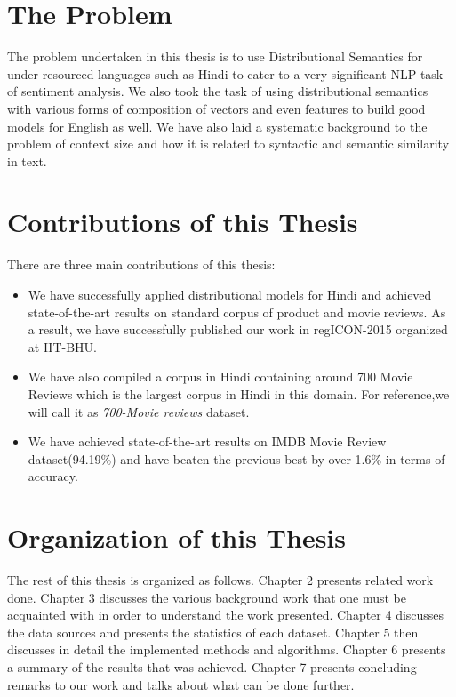 \section{The Problem}
The problem undertaken in this thesis is to use Distributional Semantics for under-resourced languages such as Hindi to cater to a very significant NLP task of sentiment analysis. We also took the task of using distributional semantics with various forms of composition of vectors and even features to build good models for English as well. We have also laid a systematic background to the problem of context size and how it is related to syntactic and semantic similarity in text. 

\section{Contributions of this Thesis}
There are three main contributions of this thesis:
\begin{itemize}
\item We have successfully applied distributional models for Hindi and achieved state-of-the-art results on standard corpus of product and movie reviews. As a result, we have successfully published our work in regICON-2015 organized at IIT-BHU.
\item We have also compiled a corpus in Hindi containing around 700 Movie Reviews which is the largest corpus in Hindi in this domain. For reference,we will call it as \emph{700-Movie reviews} dataset.
\item We have achieved state-of-the-art results on IMDB Movie Review dataset(94.19\%) and have beaten the previous best by over 1.6\% in terms of accuracy.
\end{itemize}

\section{Organization of this Thesis}
The rest of this thesis is organized as follows. Chapter 2 presents related work done. Chapter 3 discusses the various background work that one must be acquainted with in order to understand the work presented. Chapter 4 discusses the data sources and presents the statistics of each dataset. Chapter 5 then discusses in detail the implemented methods and algorithms. Chapter 6 presents a summary of the results that was achieved. Chapter 7 presents concluding remarks to our work and talks about what can be done further.
